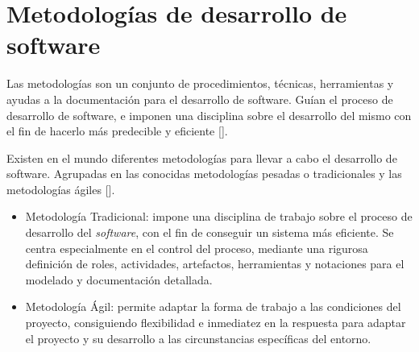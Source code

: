 \section{Metodologías de desarrollo de software}
Las metodologías son un conjunto de procedimientos, técnicas, herramientas y ayudas a la documentación para el desarrollo de software. Guían el proceso de desarrollo de software, e imponen una disciplina sobre el desarrollo del mismo con el fin de hacerlo más predecible y eficiente [\cite{91}].

Existen en el mundo diferentes metodologías para llevar a cabo el desarrollo de software. Agrupadas en las conocidas metodologías pesadas o tradicionales y las metodologías ágiles [\cite{92}].

\begin{itemize}
\item Metodología Tradicional: impone una disciplina de trabajo sobre el proceso de desarrollo del \textit{software}, con el fin de conseguir un sistema más eficiente. Se centra especialmente en el control del proceso, mediante una rigurosa definición de roles, actividades, artefactos, herramientas y notaciones para el modelado y documentación detallada.
\item Metodología Ágil: permite adaptar la forma de trabajo a las condiciones del proyecto, consiguiendo flexibilidad e inmediatez en la respuesta para adaptar el proyecto y su desarrollo a las circunstancias específicas del entorno.
\end{itemize}


